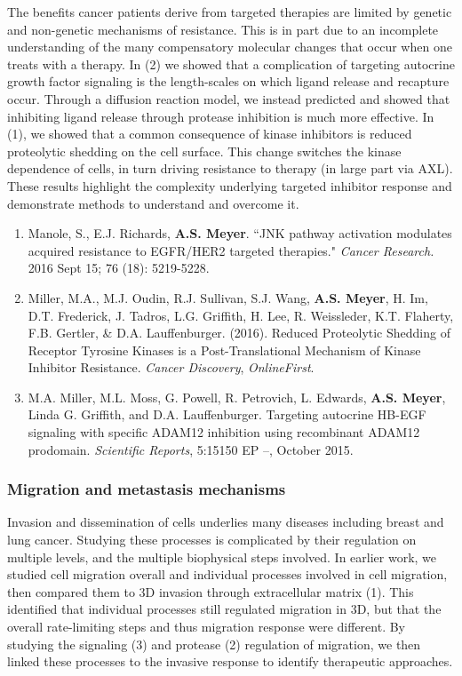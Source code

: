 \documentclass[11pt]{article}
\begin{document}
The benefits cancer patients derive from targeted therapies are limited by genetic and non-genetic mechanisms of resistance. This is in part due to an incomplete understanding of the many compensatory molecular changes that occur when one treats with a therapy. In (2) we showed that a complication of targeting autocrine growth factor signaling is the length-scales on which ligand release and recapture occur. Through a diffusion reaction model, we instead predicted and showed that inhibiting ligand release through protease inhibition is much more effective. In (1), we showed that a common consequence of kinase inhibitors is reduced proteolytic shedding on the cell surface. This change switches the kinase dependence of cells, in turn driving resistance to therapy (in large part via AXL). These results highlight the complexity underlying targeted inhibitor response and demonstrate methods to understand and overcome it.

\begin{enumerate}
  \item Manole, S., E.J. Richards, {\bf A.S. Meyer}. ``JNK pathway activation modulates acquired resistance to EGFR/HER2 targeted therapies." {\sl Cancer Research.} 2016 Sept 15; 76 (18): 5219-5228.
  \item Miller, M.A., M.J. Oudin, R.J. Sullivan, S.J. Wang, \textbf{A.S. Meyer}, H. Im, D.T. Frederick, J. Tadros, L.G. Griffith, H. Lee, R. Weissleder, K.T. Flaherty, F.B. Gertler, \& D.A. Lauffenburger. (2016). Reduced Proteolytic Shedding of Receptor Tyrosine Kinases is a Post-Translational Mechanism of Kinase Inhibitor Resistance. \emph{Cancer Discovery}, \emph{OnlineFirst}.
  \item M.A. Miller, M.L. Moss, G. Powell, R. Petrovich, L. Edwards, \textbf{A.S. Meyer}, Linda G. Griffith, and D.A. Lauffenburger. Targeting autocrine HB-EGF signaling with specific ADAM12 inhibition using recombinant ADAM12 prodomain. \emph{Scientific Reports}, 5:15150 EP --, October 2015.
\end{enumerate}





\subsubsection{Migration and metastasis mechanisms}

Invasion and dissemination of cells underlies many diseases including breast and lung cancer. Studying these processes is complicated by their regulation on multiple levels, and the multiple biophysical steps involved. In earlier work, we studied cell migration overall and individual processes involved in cell migration, then compared them to 3D invasion through extracellular matrix (1). This identified that individual processes still regulated migration in 3D, but that the overall rate-limiting steps and thus migration response were different. By studying the signaling (3) and protease (2) regulation of migration, we then linked these processes to the invasive response to identify therapeutic approaches.
\end{document}
